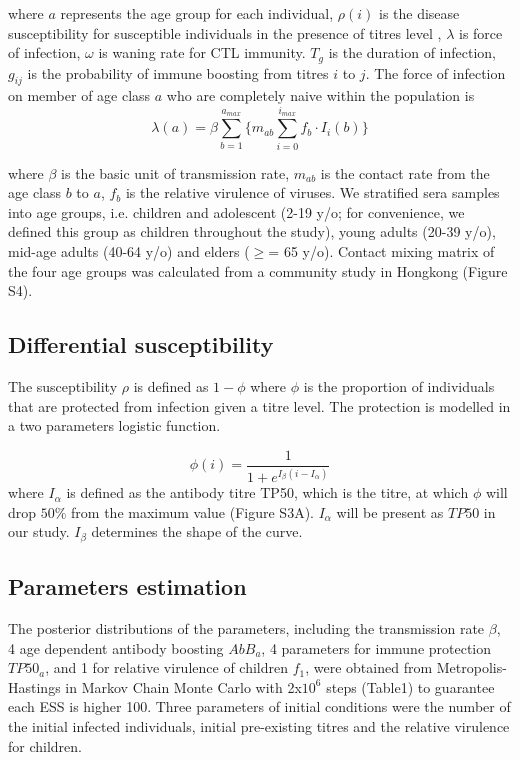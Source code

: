 \documentclass{article}
\begin{document}
where $a$ represents the age group for each individual, $\rho(i)$ is the disease susceptibility for susceptible individuals in the presence of titres level , $\lambda$ is force of infection, $\omega$ is waning rate for CTL immunity. $T_{g}$ is the duration of infection, $g_{ij}$ is the probability of immune boosting from titres $i$ to $j$. The force of infection on member of age class $a$ who are completely naive within the population is 
\begin{equation}
 \lambda(a)=\beta\sum_{b=1}^{a_{max}}{\Big\{m_{ab}\sum_{i=0}^{i_{max}}f_{b}\cdot I_{i}(b)\Big\}}
\end{equation}

where $\beta$ is the basic unit of transmission rate, $m_{ab}$ is the contact rate from the age class $b$ to $a$, $f_{b}$ is the relative virulence of viruses. We stratified sera samples into age groups, i.e. children and adolescent (2-19 y/o; for convenience, we defined this group as children throughout the study), young adults (20-39 y/o), mid-age adults (40-64 y/o) and elders ($\geq$= 65 y/o). Contact mixing matrix of the four age groups was calculated from a community study in Hongkong (Figure S4).

\subsection{Differential susceptibility}
The susceptibility $\rho$ is defined as $1-\phi$ where $\phi$ is the proportion of individuals that are protected from infection given a titre level. The protection is modelled in a two parameters logistic function.

\begin{equation}
 \phi(i) = \frac{1}{1+e^{I_{\beta}({i}-I_{\alpha})}}
\end{equation}
where $I_{\alpha}$ is defined as the antibody titre TP50, which is the titre, at which $\phi$ will drop $50\%$ from the maximum value (Figure S3A). $I_{\alpha}$ will be present as $\mathit{TP50}$ in our study. $I_{\beta}$ determines the shape of the curve.

\subsection{Parameters estimation}
The posterior distributions of the parameters, including the transmission rate $\beta$, 4 age dependent antibody boosting $AbB_{a}$, 4 parameters for immune protection $\mathit{TP50_{a}}$, and 1 for relative virulence of children $f_{1}$, were obtained from Metropolis-Hastings in Markov Chain Monte Carlo with 2x$10^{6}$ steps (Table1) to guarantee each ESS is higher 100. Three parameters of initial conditions were the number of the initial infected individuals, initial pre-existing titres and the relative virulence for children.
   
\end{document}
